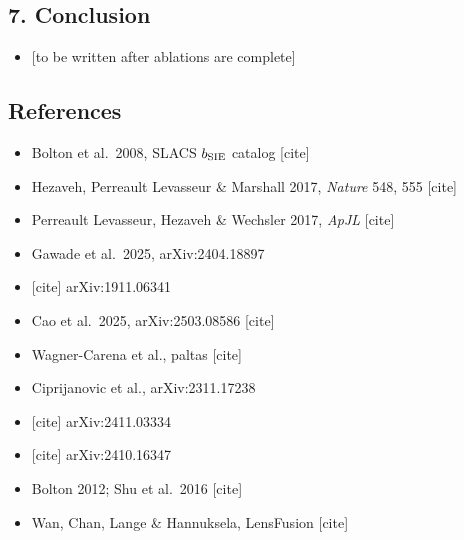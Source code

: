 \documentclass[
  11pt,
]{article}
\providecommand{\tightlist}{%
  \setlength{\itemsep}{0pt}\setlength{\parskip}{0pt}}
\begin{document}
\hypertarget{conclusion}{%
\subsection{7. Conclusion}\label{conclusion}}

\begin{itemize}
\tightlist
\item
  {[}to be written after ablations are complete{]}
\end{itemize}

\hypertarget{references}{%
\subsection{References}\label{references}}

\begin{itemize}
\tightlist
\item
  Bolton et al.~2008, SLACS \(b_{\rm SIE}\) catalog {[}cite{]}
\item
  Hezaveh, Perreault Levasseur \& Marshall 2017, \emph{Nature} 548, 555
  {[}cite{]}
\item
  Perreault Levasseur, Hezaveh \& Wechsler 2017, \emph{ApJL} {[}cite{]}
\item
  Gawade et al.~2025, arXiv:2404.18897
\item
  {[}cite{]} arXiv:1911.06341
\item
  Cao et al.~2025, arXiv:2503.08586 {[}cite{]}
\item
  Wagner-Carena et al., paltas {[}cite{]}
\item
  Ciprijanovic et al., arXiv:2311.17238
\item
  {[}cite{]} arXiv:2411.03334
\item
  {[}cite{]} arXiv:2410.16347
\item
  Bolton 2012; Shu et al.~2016 {[}cite{]}
\item
  Wan, Chan, Lange \& Hannuksela, LensFusion {[}cite{]}
\end{itemize}
\end{document}
